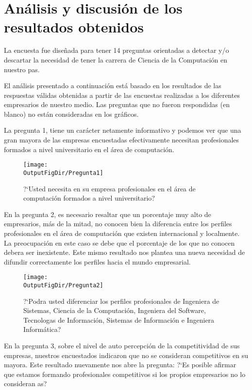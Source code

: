\section{Análisis y discusión de los resultados obtenidos}\label{sec:cs-resultados-de-la-encuesta}

La encuesta fue diseñada para tener 14 preguntas orientadas a detectar y/o descartar la necesidad de tener la carrera de Ciencia de la Computación en nuestro pa­s.

El análisis presentado a continuación está basado en los resultados de las respuestas válidas obtenidas a partir de las encuestas realizadas a los diferentes empresarios de nuestro medio. Las preguntas que no fueron respondidas (en blanco) no están consideradas en los gráficos.

La pregunta 1, tiene un carácter netamente informativo y podemos ver que una gran mayor­a de las empresas encuestadas efectivamente necesitan profesionales formados a nivel universitario en el área de computación.

\newcommand{\mywidth}{10cm}

\begin{figure}[!h]
	\centering
	\texttt{[image: \\OutputFigDir/Pregunta1]}
	\label{fig:Preg1}
	\caption{?`Usted necesita en su empresa profesionales en el área de computación formados a nivel universitario?}
\end{figure}


En la pregunta 2, es necesario resaltar que un porcentaje muy alto de empresarios, más de la mitad, no conocen bien la diferencia entre los perfiles profesionales en el área de computación que existen internacional y localmente. La preocupación en este caso se debe que el porcentaje de los que no conocen deber­a ser inexistente. Este mismo resultado nos plantea una nueva necesidad de difundir correctamente los perfiles hacia el mundo empresarial.


\begin{figure}[!h]
	\centering
	\texttt{[image: \\OutputFigDir/Pregunta2]}
	\label{fig:Preg2}
	\caption{?`Podr­a usted diferenciar los perfiles profesionales de Ingenier­a de Sistemas, Ciencia de la Computación, Ingenier­a del Software, Tecnolog­as de Información, Sistemas de Información e Ingenier­a Informática?}
\end{figure}

En la pregunta 3, sobre el nivel de auto percepción de la competitividad de sus empresas, nuestros encuestados indicaron que no se consideran competitivos en su mayor­a. Este resultado nuevamente nos abre la pregunta: ?`Es posible afirmar que estamos formando profesionales competitivos si los propios empresarios no lo consideran as­?

